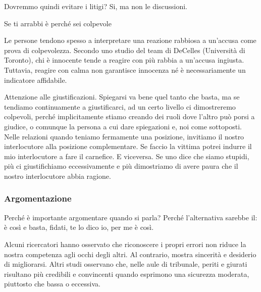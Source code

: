 \documentclass[12pt]{book} %
\begin{document}
Dovremmo quindi evitare i litigi? Si, ma non le discussioni.

\begin{mdframed}[linewidth=1pt]
Se ti arrabbi è perché sei colpevole

Le persone tendono spesso a interpretare una reazione rabbiosa a un'accusa come prova di colpevolezza. Secondo uno studio del team di DeCelles (Università di Toronto), chi è innocente tende a reagire con più rabbia a un'accusa ingiusta. Tuttavia, reagire con calma non garantisce innocenza né è necessariamente un indicatore affidabile.

Attenzione alle giustificazioni. Spiegarsi va bene quel tanto che basta, ma se tendiamo continuamente a giustificarci, ad un certo livello ci dimostreremo colpevoli, perché implicitamente stiamo creando dei ruoli dove l'altro può porsi a giudice, o comunque la persona a cui dare spiegazioni e, noi come sottoposti. 
Nelle relazioni quando teniamo fermamente una posizione, invitiamo il nostro interlocutore alla posizione complementare. 
Se faccio la vittima potrei indurre il mio interlocutore a fare il carnefice. E viceversa.
Se uno dice che siamo stupidi, più ci giustifichiamo eccessivamente e più dimostriamo di avere paura che il nostro interlocutore abbia ragione.
\end{mdframed}

\subsubsection{Argomentazione}
Perché è importante argomentare quando si parla? Perché l'alternativa sarebbe il: è così e basta, fidati, te lo dico io, per me è così. 

Alcuni ricercatori hanno osservato che riconoscere i propri errori non riduce la nostra competenza agli occhi degli altri. Al contrario, mostra sincerità e desiderio di migliorarsi. Altri studi osservano che, nelle aule di tribunale, periti e giurati risultano più credibili e convincenti quando esprimono una sicurezza moderata, piuttosto che bassa o eccessiva.
\end{document}
